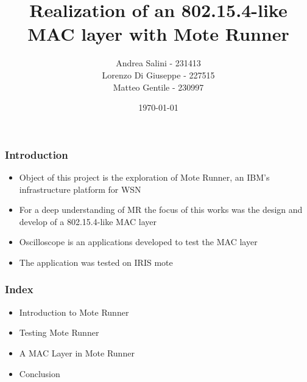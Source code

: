 \documentclass[12pt, compress]{beamer}
\title{Realization of an 802.15.4-like MAC layer with Mote Runner}
\subtitle{}
\date{\today}
\author{Andrea Salini - 231413\\Lorenzo Di Giuseppe - 227515\\Matteo Gentile - 230997}
\institute{DISIM - Università degli Studi dell’Aquila}
\begin{document}
  \maketitle
  
\begin{frame}[fragile]
  \frametitle{Introduction}
  \begin{itemize}
    \item Object of this project is the exploration of Mote Runner, an IBM’s infrastructure platform for WSN
    \item For a deep understanding of MR the focus of this works was the design and develop of a 802.15.4-like MAC layer
    \item Oscilloscope is an applications developed to test the MAC layer
    \item The application was tested on IRIS mote
  \end{itemize}
\end{frame}

\begin{frame}[fragile]
  \frametitle{Index}
  \begin{itemize}
    \item Introduction to Mote Runner
    \item Testing Mote Runner
    \item A MAC Layer in Mote Runner
    \item Conclusion
  \end{itemize}
\end{frame}





\end{document}
